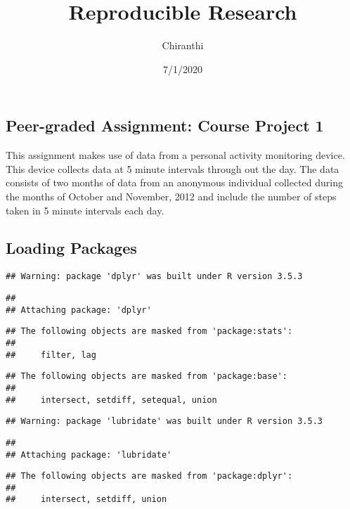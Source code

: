 \documentclass[
]{article}
\title{Reproducible Research}
\author{Chiranthi}
\date{7/1/2020}
\begin{document}
\maketitle

\hypertarget{peer-graded-assignment-course-project-1}{%
\subsection{Peer-graded Assignment: Course Project
1}\label{peer-graded-assignment-course-project-1}}

This assignment makes use of data from a personal activity monitoring
device. This device collects data at 5 minute intervals through out the
day. The data consists of two months of data from an anonymous
individual collected during the months of October and November, 2012 and
include the number of steps taken in 5 minute intervals each day.

\hypertarget{loading-packages}{%
\subsection{Loading Packages}\label{loading-packages}}

\begin{verbatim}
## Warning: package 'dplyr' was built under R version 3.5.3
\end{verbatim}

\begin{verbatim}
## 
## Attaching package: 'dplyr'
\end{verbatim}

\begin{verbatim}
## The following objects are masked from 'package:stats':
## 
##     filter, lag
\end{verbatim}

\begin{verbatim}
## The following objects are masked from 'package:base':
## 
##     intersect, setdiff, setequal, union
\end{verbatim}

\begin{verbatim}
## Warning: package 'lubridate' was built under R version 3.5.3
\end{verbatim}

\begin{verbatim}
## 
## Attaching package: 'lubridate'
\end{verbatim}

\begin{verbatim}
## The following objects are masked from 'package:dplyr':
## 
##     intersect, setdiff, union
\end{verbatim}
\end{document}
